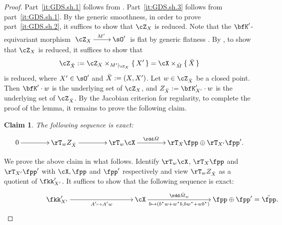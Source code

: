 \documentclass[12pt,a4paper]{amsart}
\newcommand{\trivial}[2][]{\if\relax\detokenize{#1}\relax
  {%
      \color{orange} \vspace{0em} $[$  #2 $]$
      \color{black}
  }
  \else
\ifx#1h
\ifcsname showtrivial\endcsname
{%
    \color{orange} \vspace{0em}  $[$ #2 $]$
    \color{black}
}
\fi
\else {\red Wrong argument!} \fi
\fi
}
\numberwithin{equation}{section}
\newtheorem*{thm*}{Theorem}
\newtheorem*{claim*}{Claim}
\theoremstyle{remark}
\def\MMP{M}
\def\mstar{{\star}}
\def\ZX{\cZ_{X}}
\begin{document}
\begin{proof} Part~\cref{it:GDS.sh.1} follows from \cite[Table~4]{DKP2}. Part~\cref{it:GDS.sh.3} follows from part~\cref{it:GDS.sh.1}. By the generic smoothness, in order to prove
  part~\cref{it:GDS.sh.2}, it suffices to show that $\ZX$ is reduced.
  Note that the $\bfK'$-equivariant morphism $\xymatrix{\ZX\ar[r]^{M'}&\sO'}$ is
  flat by generic flatness \cite[Th\'eor\`eme~6.9.1]{EGAIV2}.
  By \cite[Proposition~11.3.13]{EGAIV3}, to show that $\ZX$ is reduced, it
  suffices to show that
  $$\ZdbX := \ZZ_X \times_{M'|_{\ZX}}\set{X'} = \cX \times_{\dbM}\set{\dbX}$$
  is reduced, where $X'\in \sO'$ and $\breve{X}:=(X,X')$.
  Let $w\in\ZdbX$ be a closed point. Then $\bfK'\cdot w$ is the underlying set of $\ZX$, and
  $Z_{\dbX}:=\bfK'_{X'}\cdot w$ is the underlying set of
  $\ZdbX$.  By
  the Jacobian criterion for regularity, to complete the proof of the lemma, it remains to prove the following claim.

  \begin{claim*}
    The following sequence is exact:
    \[%
        \xymatrix@C=4em{ 0 \ar[r] & \rT_w
        Z_{\dbX} \ar[r] & \rT_w\cX \ar[r]^<>(.5){\rdd \dbM} &
        \rT_{X}{\fpp}\oplus \rT_{X'}{\fpp'}. }
    \]%
  \end{claim*}

We prove the above claim in what follows.
    Identify $\rT_w\cX$, $\rT_X\fpp$ and $\rT_{X'}\fpp'$ with $\cX,\fpp$ and
    $\fpp'$ respectively and view $\rT_{w} Z_{\dbX}$ as a quotient of
    $\fkk'_{X'}$. It suffices to show that the following sequence is exact:
    \begin{equation}\label{eq:GDS.T2}
      \xymatrix@R=0em@C=9em{
        \fkk'_{X'} \ar[r]_<>(.5){A' \mapsto A'w}& \cX\ar[r]^<>(.5){\rdd \dbM_{w}}_<>(.5){ b\mapsto (b^\mstar w+w^\mstar b, b w^\mstar + w b^\mstar) }&
        \makebox[0em][l]{$\fpp\oplus \fpp' =\dbfpp$.}\\
      }
    \end{equation}


\end{proof}
\end{document}
